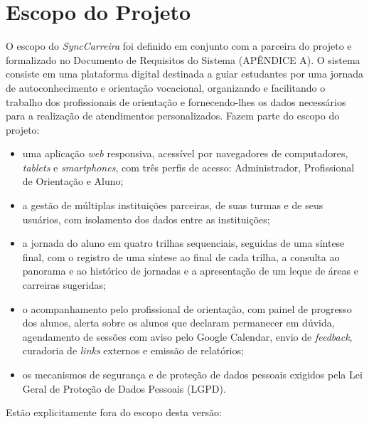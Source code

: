 \section{Escopo do Projeto}\label{sec:escopo}

O escopo do \textit{SyncCarreira} foi definido em conjunto com a parceira do projeto e formalizado no Documento de Requisitos do Sistema (APÊNDICE A). O sistema consiste em uma plataforma digital destinada a guiar estudantes por uma jornada de autoconhecimento e orientação vocacional, organizando e facilitando o trabalho dos profissionais de orientação e fornecendo-lhes os dados necessários para a realização de atendimentos personalizados. Fazem parte do escopo do projeto:

\begin{itemize}
    \item uma aplicação \textit{web} responsiva, acessível por navegadores de computadores, \textit{tablets} e \textit{smartphones}, com três perfis de acesso: Administrador, Profissional de Orientação e Aluno;
    \item a gestão de múltiplas instituições parceiras, de suas turmas e de seus usuários, com isolamento dos dados entre as instituições;
    \item a jornada do aluno em quatro trilhas sequenciais, seguidas de uma síntese final, com o registro de uma síntese ao final de cada trilha, a consulta ao panorama e ao histórico de jornadas e a apresentação de um leque de áreas e carreiras sugeridas;
    \item o acompanhamento pelo profissional de orientação, com painel de progresso dos alunos, alerta sobre os alunos que declaram permanecer em dúvida, agendamento de sessões com aviso pelo Google Calendar, envio de \textit{feedback}, curadoria de \textit{links} externos e emissão de relatórios;
    \item os mecanismos de segurança e de proteção de dados pessoais exigidos pela Lei Geral de Proteção de Dados Pessoais (LGPD).
\end{itemize}

Estão explicitamente fora do escopo desta versão:

